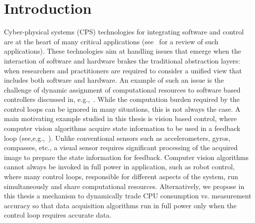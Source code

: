 \documentclass[ twoside, 12pt ]{article}
\begin{document}
\begin{titlepage}
    \hspace{3cm}
\end{titlepage}

\newpage


\newpage
{}


\newpage
\tableofcontents
\newpage
\listoffigures
\newpage



\section{Introduction} %
Cyber-physical systems (CPS) technologies for integrating software and control are at the heart of many critical applications (see~\cite{lee2008cyber} for a review of such applications). These technologies aim at handling issues that emerge when the interaction of software and hardware brakes the traditional abstraction layers: when researchers and practitioners are required to consider a unified view that includes both software and hardware. An example of such an issue is the challenge of dynamic assignment of computational resources to software based controllers discussed in, e.g.,~\cite{arzen2000introduction,tabuada2007event,weiss2007automata}. While the computation burden required by the control loops can be ignored in many situations, this is not always the case. A main motivating example studied in this thesis is vision based control, where computer vision algorithms acquire state information to be used in a feedback loop (see,e.g.,~\cite{das2002vision,shakernia1999landing,Efraim2017}). Unlike conventional sensors such as accelerometers, gyros, compasses, etc., a visual sensor requires significant processing of the acquired image to prepare the state information for feedback. Computer vision algorithms cannot always be invoked in full power in application, such as robot control, where many control loops, responsible for different aspects of the system, run simultaneously and share computational resources. Alternatively, we propose in this thesis a mechanism to dynamically trade CPU consumption vs. measurement accuracy so that data acquisition algorithms run in full power only when the control loop requires accurate data.
\end{document}
